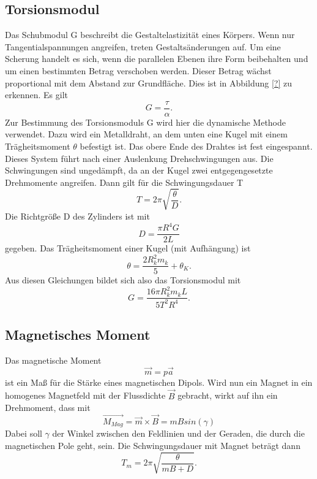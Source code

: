 \documentclass[11pt,ngerman,a4paper]{article}
\begin{document}
\subsection{Torsionsmodul}
Das Schubmodul G beschreibt die Gestaltelastizität eines Körpers. Wenn nur Tangentialspannungen angreifen, treten Gestaltsänderungen auf. Um eine Scherung handelt es sich, wenn die parallelen Ebenen ihre Form beibehalten und um einen bestimmten Betrag verschoben werden. Dieser Betrag wächst proportional mit dem Abstand zur Grundfläche. Dies ist in Abbildung \ref{?} zu erkennen.
Es gilt
\begin{equation}
\label{4}
G = \frac{\tau}{\alpha}.
\end{equation}
Zur Bestimmung des Torsionsmoduls G wird hier die dynamische Methode verwendet. Dazu wird ein Metalldraht, an dem unten eine Kugel mit einem Trägheitsmoment $\theta$ befestigt ist. Das obere Ende des Drahtes ist fest eingespannt. Dieses System führt nach einer Auslenkung Drehschwingungen aus. Die Schwingungen sind ungedämpft, da an der Kugel zwei entgegengesetzte Drehmomente angreifen.
Dann gilt für die Schwingungsdauer T
\begin{equation}
\label{5}
T=2\pi \sqrt{\frac{\theta}{D}}.
\end{equation}
Die Richtgröße D des Zylinders ist mit
\begin{equation}
\label{6}
D=\frac{\pi  R^4 G}{2L}
\end{equation}
gegeben. Das Trägheitsmoment einer Kugel (mit Aufhängung) ist
\begin{equation}
\label{7}
\theta=\frac{2R_k^2m_k}{5}+\theta_K.
\end{equation}
Aus diesen Gleichungen bildet sich also das Torsionsmodul mit
\begin{equation}
\label{8}
G=\frac{16\pi R_k^2m_kL}{5T^2R^4}.
\end{equation}
\subsection{Magnetisches Moment}
Das magnetische Moment
\begin{equation}
\label{9}
\vec{m}=p\vec{a} 
\end{equation}
ist ein Maß für die Stärke eines magnetischen Dipols. Wird nun ein Magnet in ein homogenes Magnetfeld mit der Flussdichte $\vec{B}$  gebracht, wirkt auf ihn ein Drehmoment, dass mit
\begin{equation}
\label{10}
\vec{M_{Mag}}=\vec{m} \times \vec{B} = m B sin(\gamma)
\end{equation}
Dabei soll $\gamma$ der Winkel zwischen den Feldlinien und der Geraden, die durch die magnetischen Pole geht, sein.
Die Schwingungsdauer mit Magnet beträgt dann
\begin{equation}
\label{11}
T_m=2\pi \sqrt{\frac{\theta}{mB+D}}.
\end{equation}
\end{document}
